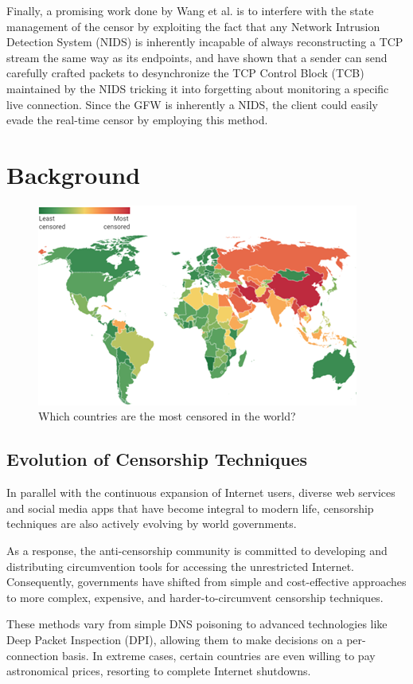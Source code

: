 Finally, a promising work done by Wang et al. is to interfere with the state management of the censor by exploiting the fact that any Network Intrusion Detection System (NIDS) is inherently incapable of always reconstructing a TCP stream the same way as its endpoints, and have shown that a sender can send carefully crafted packets to desynchronize the TCP Control Block (TCB) maintained by the NIDS tricking it into forgetting about monitoring a specific live connection. Since the GFW is inherently a NIDS, the client could easily evade the real-time censor by employing this method.\cite{wang2017state}

\section{Background}
\begin{figure}[tp]
	\centering
	\includegraphics{figures/WorldCensorship}
	\caption{
		Which countries are the most censored in the world?
		\cite{comparitech2023}
	}
\end{figure}

\subsection{Evolution of Censorship Techniques}
In parallel with the continuous expansion of Internet users, diverse web services and social media apps that have become integral to modern life, censorship techniques are also actively evolving by world governments. 

As a response, the anti-censorship community is committed to developing and distributing circumvention tools for accessing the unrestricted Internet. Consequently, governments have shifted from simple and cost-effective approaches to more complex, expensive, and harder-to-circumvent censorship techniques.

These methods vary from simple DNS poisoning to advanced technologies like Deep Packet Inspection (DPI), allowing them to make decisions on a per-connection basis. In extreme cases, certain countries are even willing to pay astronomical prices, resorting to complete Internet shutdowns.

